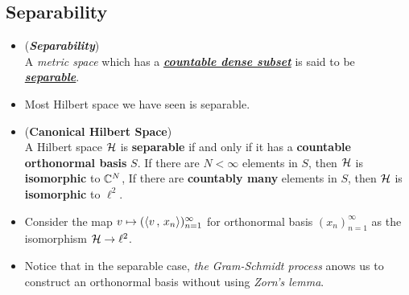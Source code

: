 \documentclass[11pt]{article}
\begin{document}
\subsection{Separability}
\begin{itemize}
\item \begin{definition} (\emph{\textbf{Separability}})\\
A \emph{metric space} which has a \underline{\emph{\textbf{countable dense subset}}} is said to be \underline{\emph{\textbf{separable}}}.
\end{definition}

\item \begin{remark}
Most Hilbert space we have seen is separable.
\end{remark}

\item \begin{proposition} (\textbf{Canonical Hilbert Space})\\
A Hilbert space ${\mathcal H}$ is \textbf{separable} if and only if it has a \textbf{countable orthonormal basis} $S$. If there are $N < \infty$ elements in $S$, then ${\mathcal H}$ is
\textbf{isomorphic} to ${\mathbb C}^N$, If there are \textbf{countably many} elements in $S$, then ${\mathcal H}$ is \textbf{isomorphic} to $\ell^{2}$.
\end{proposition}

\item \begin{remark}
Consider the map $v \mapsto (\left\langle v\,,\, x_{n} \right\rangle)_{n=1}^{\infty}$ for orthonormal basis $(x_n)_{n=1}^{\infty}$ as the isomorphism ${\mathcal H} \rightarrow \ell^2$.
\end{remark}

\item \begin{remark}
Notice that in the separable case, \emph{the Gram-Schmidt process} anows us to construct an orthonormal basis without using \emph{Zorn's lemma}.
\end{remark}
\end{itemize}
\end{document}
